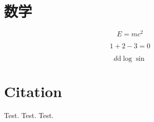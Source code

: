 \chapter{数学}

\begin{equation}
    E=mc^2
\end{equation}

\begin{equation}
1 + 2 - 3 = 0
\end{equation}

\begin{equation}
d\mathrm{d}\log \sin
\end{equation}


\chapter{Citation}

Test\cite{mittelbach04}.
Test\cite{lamport94}.
Test\cite{knuth86a,lamport94,mittelbach04}.
